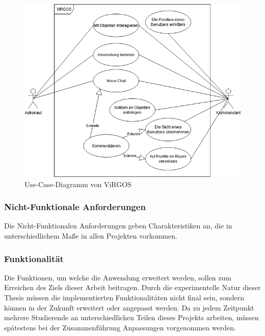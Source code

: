 \begin{figure}[H]
\centering
\includegraphics[width=1\textwidth]{ViRGOS_UseCase.png}
\caption{Use-Case-Diagramm von ViRGOS}
\end{figure}

\subsubsection{Nicht-Funktionale Anforderungen}
Die Nicht-Funktionalen Anforderungen geben Charakteristiken an, die in unterschiedlichem Maße in allen Projekten vorkommen.

\subsubsection*{Funktionalität}
Die Funktionen, um welche die Anwendung erweitert werden, sollen zum Erreichen des Ziels dieser Arbeit beitragen. Durch die experimentelle Natur dieser Thesis müssen die implementierten Funktionalitäten nicht final sein, sondern können in der Zukunft erweitert oder angepasst werden. Da zu jedem Zeitpunkt mehrere Studierende an unterschiedlichen Teilen dieses Projekts arbeiten, müssen spätestens bei der Zusammenführung Anpassungen vorgenommen werden.

